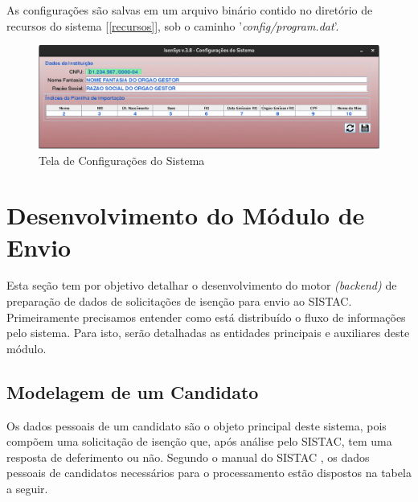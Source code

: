 \documentclass[
	12pt,			%
	openright,		%
	oneside,	
	a4paper,		%
	english,		%
	brazil			%
]{abntex2/abntex2}  %
\begin{document}
			As configurações são salvas em um arquivo binário contido no diretório de recursos do sistema [\ref{recursos}], sob o caminho '\textit{config/program.dat}'.

			\begin{figure}[ht]
				\begin{center}
					
					\caption{Tela de Configurações do Sistema}
					\includegraphics[scale=0.45]{img/configs-ui}
					
				\end{center}
			\end{figure}

		\clearpage
		\section{Desenvolvimento do Módulo de Envio}
	
			Esta seção tem por objetivo detalhar o desenvolvimento do motor \textit{(backend)} de preparação de dados de solicitações de isenção para envio ao SISTAC. Primeiramente precisamos entender como está distribuído o fluxo de informações pelo sistema. Para isto, serão detalhadas as entidades principais e auxiliares deste módulo.
	
			\subsection{Modelagem de um Candidato} \label{candidato}
	
				Os dados pessoais de um candidato são o objeto principal deste sistema, pois compõem uma solicitação de isenção que, após análise pelo SISTAC, tem uma resposta de deferimento ou não. Segundo o manual do SISTAC \cite{sistac-formatos}, os dados pessoais de candidatos necessários para o processamento estão dispostos na tabela a seguir.
\end{document}
